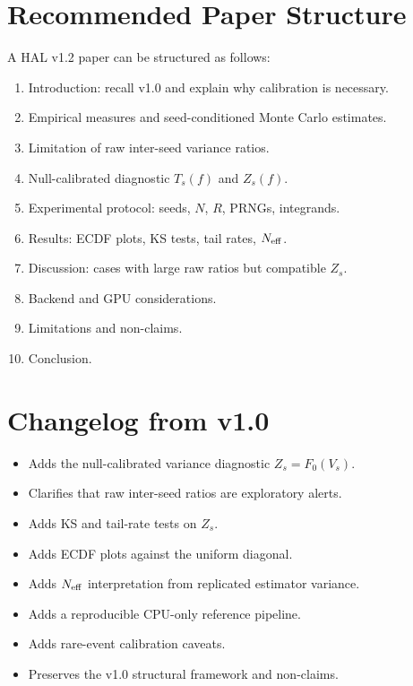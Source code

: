 \documentclass[11pt,a4paper]{article}
\begin{document}
\section{Recommended Paper Structure}

A HAL v1.2 paper can be structured as follows:
\begin{enumerate}
  \item Introduction: recall v1.0 and explain why calibration is necessary.
  \item Empirical measures and seed-conditioned Monte Carlo estimates.
  \item Limitation of raw inter-seed variance ratios.
  \item Null-calibrated diagnostic \(T_s(f)\) and \(Z_s(f)\).
  \item Experimental protocol: seeds, \(N\), \(R\), PRNGs, integrands.
  \item Results: ECDF plots, KS tests, tail rates, \(N_{\rm eff}\).
  \item Discussion: cases with large raw ratios but compatible \(Z_s\).
  \item Backend and GPU considerations.
  \item Limitations and non-claims.
  \item Conclusion.
\end{enumerate}

\section{Changelog from v1.0}

\begin{itemize}
  \item Adds the null-calibrated variance diagnostic \(Z_s=F_0(V_s)\).
  \item Clarifies that raw inter-seed ratios are exploratory alerts.
  \item Adds KS and tail-rate tests on \(Z_s\).
  \item Adds ECDF plots against the uniform diagonal.
  \item Adds \(N_{\rm eff}\) interpretation from replicated estimator variance.
  \item Adds a reproducible CPU-only reference pipeline.
  \item Adds rare-event calibration caveats.
  \item Preserves the v1.0 structural framework and non-claims.
\end{itemize}
\end{document}
